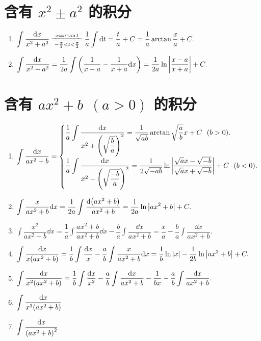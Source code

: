 \section{含有 \texorpdfstring{$x^2\pm a^2$}. 的积分}

\begin{enumerate}[label=\roman{*}.]
    \item $\displaystyle\int\dfrac{\dd x}{x^2+a^2}\xlongequal[-\frac{\pi}{2}<t<\frac{\pi}{2}]{x=a\tan t}\dfrac{1}{a}\int\dd t=\dfrac{t}{a}+C=\dfrac{1}{a}\arctan\dfrac{x}{a}+C.$
    \item $\displaystyle\int\dfrac{\dd x}{x^2-a^2}=\dfrac{1}{2a}\int\qty(\dfrac{1}{x-a}-\dfrac{1}{x+a}\dd x)=\dfrac{1}{2a}\ln\qty|\dfrac{x-a}{x+a}|+C.$
\end{enumerate}

\section{含有 \texorpdfstring{$ax^2+b~~(a>0)$}. 的积分}

\begin{enumerate}[label=\roman{*}.]
    \item $\displaystyle \int\dfrac{\dd x}{ax^2+b}=\begin{cases}
                  \displaystyle \dfrac{1}{a}\int\dfrac{\dd x}{x^2+\qty(\sqrt{\dfrac{b}{a}})^2}=\dfrac{1}{\sqrt{ab}}\arctan\sqrt{\dfrac{a}{b}}x+C~~(b>0). \\
                  \displaystyle \dfrac{1}{a}\int\dfrac{\dd x}{x^2-\qty(\sqrt{\dfrac{-b}{a}})^2}=\dfrac{1}{2\sqrt{-ab}}\ln\qty|\dfrac{\sqrt{a}x-\sqrt{-b}}{\sqrt{a}x+\sqrt{-b}}|+C~~(b<0).
              \end{cases}$
    \item $\displaystyle \int\dfrac{x}{ax^2+b}\dd x=\dfrac{1}{2a}\int\dfrac{\dd \qty(ax^2+b)}{ax^2+b}=\dfrac{1}{2a}\ln\qty|ax^2+b|+C.$
    \item $\displaystyle \int\dfrac{x^2}{ax^2+b}\dd x=\dfrac{1}{a}\int\dfrac{ax^2+b}{ax^2+b}\dd x-\dfrac{b}{a}\int\dfrac{\dd x}{ax^2+b}=\dfrac{x}{a}-\dfrac{b}{a}\int\dfrac{\dd x}{ax^2+b}.$
    \item $\displaystyle \int\dfrac{\dd x}{x\qty(ax^2+b)}=\dfrac{1}{b}\int\dfrac{\dd x}{x}-\dfrac{a}{b}\int\dfrac{x}{ax^2+b}\dd x=\dfrac{1}{b}\ln|x|-\dfrac{1}{2b}\ln\qty|ax^2+b|+C.$
    \item $\displaystyle \int\dfrac{\dd x}{x^2\qty(ax^2+b)}=\dfrac{1}{b}\int\dfrac{\dd x}{x^2}-\dfrac{a}{b}\int\dfrac{\dd x}{ax^2+b}-\dfrac{1}{bx}-\dfrac{a}{b}\int\dfrac{\dd x}{ax^2+b}.$
    \item $\displaystyle \int\dfrac{\dd x}{x^3\qty(ax^2+b)}$
    \item $\displaystyle \int\dfrac{\dd x}{\qty(ax^2+b)^2}$
\end{enumerate}

